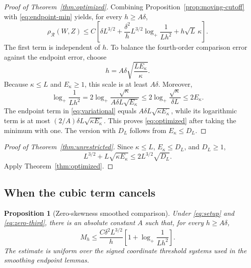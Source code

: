\documentclass[11pt,letterpaper]{article}
\newtheorem{proposition}{Proposition}
\theoremstyle{remark}
\newcommand{\rh}{\rho_{\mathcal R}}
\begin{document}
\begin{proof}[Proof of Theorem~\ref{thm:optimized}]
Combining Proposition~\ref{prop:moving-cutoff} with
\eqref{eq:endpoint-min} yields, for every \(h\ge A\delta\),
\begin{equation}
 \rh(W,Z)\le C\left[
 \delta L^{3/2}
 +\frac{\delta^2}{h}L^{3/2}\log_+\frac1{Lh^2}
 +h\sqrt L\,\kappa\right].
 \label{eq:variational}
\end{equation}
The first term is independent of \(h\). To balance the fourth-order
comparison error against the endpoint error, choose
\begin{equation}
 h=A\delta\sqrt{\frac{LE_\kappa}{\kappa}}.
 \label{eq:optimal-scale}
\end{equation}
Because \(\kappa\le L\) and \(E_\kappa\ge1\), this scale is at least
\(A\delta\). Moreover,
\[
 \log_+\frac1{Lh^2}
 =2\log_+\frac{\sqrt\kappa}{A\delta L\sqrt{E_\kappa}}
 \le2\log_+\frac{\sqrt\kappa}{\delta L}
 \le2E_\kappa.
\]
The endpoint term in \eqref{eq:variational} equals
\(A\delta L\sqrt{\kappa E_\kappa}\), while its logarithmic term is at
most \((2/A)\delta L\sqrt{\kappa E_\kappa}\).
This proves \eqref{eq:optimized} after taking the minimum with one.
The version with \(D_L\) follows from \(E_\kappa\le D_L\).
\end{proof}


\begin{proof}[Proof of Theorem~\ref{thm:unrestricted}]
Since \(\kappa\le L\), \(E_\kappa\le D_L\), and \(D_L\ge1\),
\[
 L^{3/2}+L\sqrt{\kappa E_\kappa}
 \le 2L^{3/2}\sqrt{D_L}.
\]
Apply Theorem~\ref{thm:optimized}.
\end{proof}


\subsection{When the cubic term cancels}\label{zs:section}
\begin{proposition}[Zero-skewness smoothed comparison]
\label{zs:smooth-proposition}
Under \eqref{eq:setup} and \eqref{eq:zero-third}, there is an absolute
constant \(A\) such that, for every \(h\ge A\delta\),
\begin{equation}
 M_h\le \frac{C\delta^2L^{3/2}}h
 \left[1+\log_+\frac1{Lh^2}\right].
 \label{zs:smooth}
\end{equation}
The estimate is uniform over the signed coordinate threshold systems
used in the smoothing endpoint lemmas.
\end{proposition}
\end{document}
